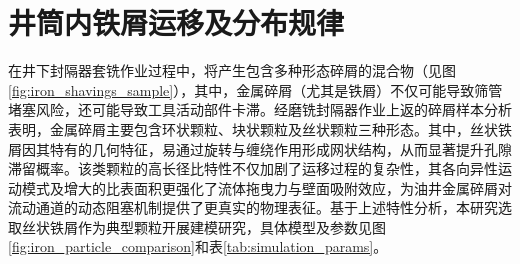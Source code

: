 





\section{井筒内铁屑运移及分布规律}

在井下封隔器套铣作业过程中，将产生包含多种形态碎屑的混合物（见图\ref{fig:iron_shavings_sample}），其中，金属碎屑（尤其是铁屑）不仅可能导致筛管堵塞风险，还可能导致工具活动部件卡滞。经磨铣封隔器作业上返的碎屑样本分析表明，金属碎屑主要包含环状颗粒、块状颗粒及丝状颗粒三种形态。其中，丝状铁屑因其特有的几何特征，易通过旋转与缠绕作用形成网状结构，从而显著提升孔隙滞留概率。该类颗粒的高长径比特性不仅加剧了运移过程的复杂性，其各向异性运动模式及增大的比表面积更强化了流体拖曳力与壁面吸附效应，为油井金属碎屑对流动通道的动态阻塞机制提供了更真实的物理表征。基于上述特性分析，本研究选取丝状铁屑作为典型颗粒开展建模研究，具体模型及参数见图\ref{fig:iron_particle_comparison}和表\ref{tab:simulation_params}。

